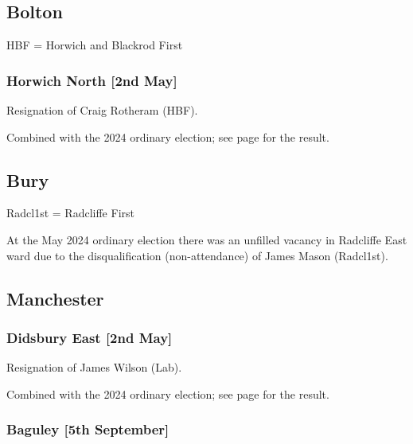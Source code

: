 \documentclass[a4paper,openany]{book}
\begin{document}
\begin{resultsiii}
\subsection*{Bolton}

HBF = Horwich and Blackrod First

\subsubsection*{Horwich North \hspace*{\fill}\nolinebreak[1]%
	\enspace\hspace*{\fill}
	[2nd May]}


Resignation of Craig Rotheram (HBF).

Combined with the 2024 ordinary election; see page \pageref{HorwichNorthBolton} for the result.

\subsection*{Bury}

Radcl1st = Radcliffe First

At the May 2024 ordinary election there was an unfilled vacancy in Radcliffe East ward due to the disqualification (non-attendance) of James Mason (Radcl1st).%

\subsection*{Manchester}

\subsubsection*{Didsbury East \hspace*{\fill}\nolinebreak[1]%
	\enspace\hspace*{\fill}
	[2nd May]}


Resignation of James Wilson (Lab).

Combined with the 2024 ordinary election; see page \pageref{DidsburyEastManchester} for the result.

\subsubsection*{Baguley \hspace*{\fill}\nolinebreak[1]%
	\enspace\hspace*{\fill}
	[5th September]}


\end{resultsiii}
\end{document}
